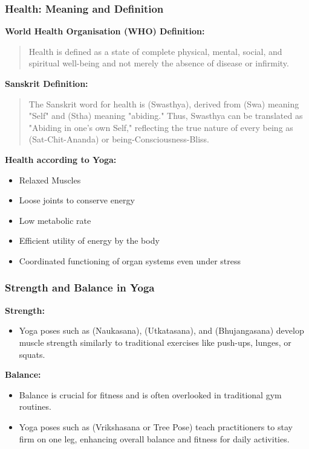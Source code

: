 \begin{frame}[fragile]\frametitle{Health: Meaning and Definition}
    \textbf{World Health Organisation (WHO) Definition:}
    \begin{quote}
        Health is defined as a state of complete physical, mental, social, and spiritual well-being and not merely the absence of disease or infirmity.
    \end{quote}

    \vspace{0.5cm}
    \textbf{Sanskrit Definition:} 
    \begin{quote}
        The Sanskrit word for health is  (Swasthya), derived from  (Swa) meaning "Self" and  (Stha) meaning "abiding." Thus, Swasthya can be translated as "Abiding in one's own Self," reflecting the true nature of every being as  (Sat-Chit-Ananda) or being-Consciousness-Bliss.
    \end{quote}

    \vspace{0.5cm}
    \textbf{Health according to Yoga:}
    \begin{itemize}
        \item Relaxed Muscles
        \item Loose joints to conserve energy
        \item Low metabolic rate
        \item Efficient utility of energy by the body
        \item Coordinated functioning of organ systems even under stress
    \end{itemize}
\end{frame}

\begin{frame}[fragile]\frametitle{Strength and Balance in Yoga}
    \textbf{Strength:}
    \begin{itemize}
        \item Yoga poses such as  (Naukasana),  (Utkatasana), and  (Bhujangasana) develop muscle strength similarly to traditional exercises like push-ups, lunges, or squats.
    \end{itemize}

    \vspace{0.5cm}
    \textbf{Balance:}
    \begin{itemize}
        \item Balance is crucial for fitness and is often overlooked in traditional gym routines. 
        \item Yoga poses such as  (Vrikshasana or Tree Pose) teach practitioners to stay firm on one leg, enhancing overall balance and fitness for daily activities.
    \end{itemize}
\end{frame}

